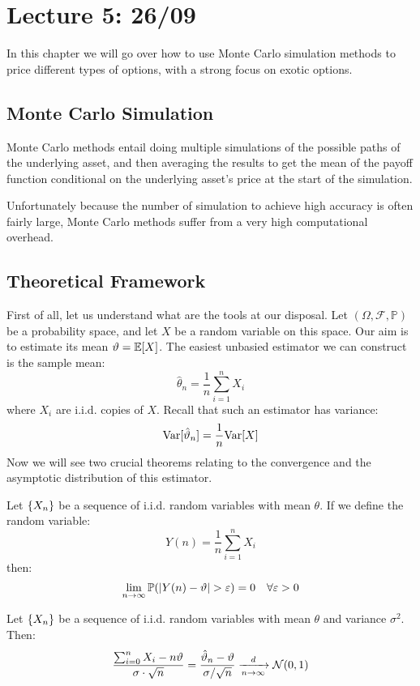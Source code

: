 \chapter{Lecture 5: 26/09}

In this chapter we will go over how to use Monte Carlo simulation methods to
price different types of options, with a strong focus on exotic options.

\section{Monte Carlo Simulation}

Monte Carlo methods entail doing multiple simulations of the possible paths of
the underlying asset, and then averaging the results to get the mean of the
payoff function conditional on the underlying asset's price at the start of the
simulation.

Unfortunately because the number of simulation to achieve high accuracy is
often fairly large, Monte Carlo methods suffer from a very high computational
overhead.

\section{Theoretical Framework}

First of all, let us understand what are the tools at our disposal.
Let $(\Omega, \mathcal{F}, \mathbb{P})$ be a probability space, and let $X$
be a random variable on this space. Our aim is to estimate its mean $\theta = 
\E[X]$. The easiest unbasied estimator we can construct is the sample mean:
\[ \hat{\theta}_n = \frac{1}{n} \sum_{i=1}^n X_i \]
where $X_i$ are i.i.d. copies of $X$.
Recall that such an estimator has variance:
\[ \Var[\hat{\theta}_n] = \frac{1}{n} \Var[X] \]
Now we will see two crucial theorems relating to the convergence and the
asymptotic distribution of this estimator.

\begin{theorem*}
Let $\seq{X}$ be a sequence of i.i.d. random variables with mean $\theta$.
If we define the random variable:
\[ Y(n) = \frac{1}{n} \sum_{i=1}^n X_i \]
then:
\[ \lim_{n\to\infty} \P(|Y(n) - \theta| > \epsilon) = 0 \quad \forall \epsilon
> 0 \]
\end{theorem*}

\begin{theorem*}
Let $\seq{X}$ be a sequence of i.i.d. random variables with mean $\theta$ and
variance $\sigma^2$. Then:
\[ \frac{\sum_{i=0}^n X_i - n\theta}{\sigma\cdot\sqrt{n}} = \frac{\hat{\theta}_n
- \theta}{\sigma / \sqrt{n}} \toin{d} \mathcal{N}(0,1) \]
\end{theorem*}

